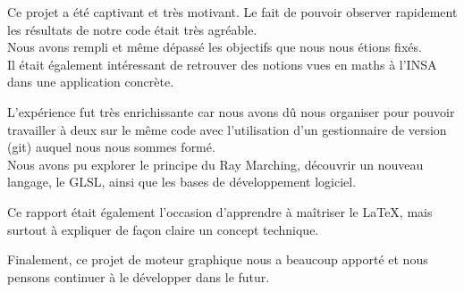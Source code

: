 
Ce projet a été captivant et très motivant. Le fait de pouvoir observer rapidement les résultats de notre code était très agréable.\\
Nous avons rempli et même dépassé les objectifs que nous nous étions fixés.\\
Il était également intéressant de retrouver des notions vues en maths à l'INSA dans une application concrète.\\ \par

L'expérience fut très enrichissante car nous avons dû nous organiser pour pouvoir travailler à deux sur le même code avec l'utilisation d'un gestionnaire de version (git) auquel nous nous sommes formé.\\
Nous avons pu explorer le principe du Ray Marching, découvrir un nouveau langage, le GLSL, ainsi que les bases de développement logiciel.\\ \par

Ce rapport était également l'occasion d'apprendre à maîtriser le LaTeX, mais surtout à expliquer de façon claire un concept technique.\\ \par

Finalement, ce projet de moteur graphique nous a beaucoup apporté et nous pensons continuer à le développer dans le futur.